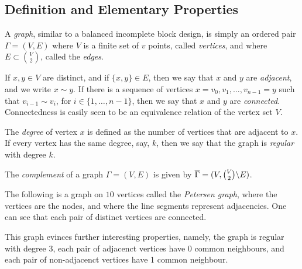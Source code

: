 \documentclass[../../../main]{subfiles}
\begin{document}
\subsection{Definition and Elementary Properties}

A {\it graph}, similar to a balanced incomplete block design, is simply an ordered pair $\Gamma = (V,E)$ where $V$ is a finite set of $v$ points, called {\it vertices}, and where $E \subset \binom{V}{2}$, called the {\it edges}.

If $x,y \in V$ are distinct, and if $\{x,y\} \in E$, then we say that $x$ and $y$ are {\it adjacent}, and we write $x \sim y$. If there is a sequence of vertices $x = v_0, v_1, \dots, v_{n-1} = y$ such that $v_{i-1} \sim v_i$, for $i \in \{1,\dots,n-1\}$, then we say that $x$ and $y$ are {\it connected}. Connectedness is easily seen to be an equivalence relation of the vertex set $V$.

The {\it degree} of vertex $x$ is defined as the number of vertices that are adjacent to $x$. If every vertex has the same degree, say, $k$, then we say that the graph is {\it regular} with degree $k$.

The {\it complement} of a graph $\Gamma = (V,E)$ is given by $\overline{\Gamma} = (V,\binom{V}{2} \backslash E)$.

\begin{ex}\label{petersen}
 The following is a graph on $10$ vertices called the {\it Petersen graph}, where the vertices are the nodes, and where the line segments represent adjacencies. One can see that each pair of distinct vertices are connected.
 \begin{defenum}
\item {}
\end{defenum}
This graph evinces further interesting properties, namely, the graph is regular with degree 3, each pair of adjacenct vertices have 0 common neighbours, and each pair of non-adjacenct vertices have 1 common neighbour.
\end{ex}
\end{document}
